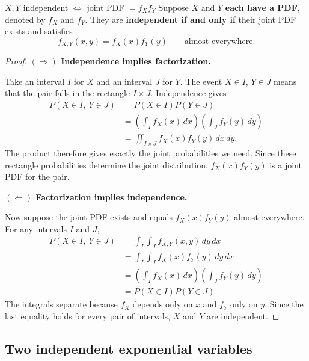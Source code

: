 \documentclass[a4paper,12pt,oneside]{report}
\begin{document}
\begin{framedprop}{$X,Y$ independent $\Longleftrightarrow$ joint PDF $=f_Xf_Y$}
\label{prop:independence-pdf}
Suppose $X$ and $Y$ \textbf{each have a PDF},
denoted by $f_X$ and $f_Y$. They are \textbf{independent if and only if}
their joint PDF exists and satisfies
\[
  f_{X,Y}(x,y)=f_X(x)f_Y(y)
  \qquad\text{almost everywhere}.
\]
\end{framedprop}
\begin{proof}
\textbf{$(\Rightarrow)$ Independence implies factorization.}\par
Take an interval $I$ for $X$ and an interval $J$ for $Y$.
The event $X\in I$, $Y\in J$ means that the pair falls in the
rectangle $I\times J$. Independence gives
\[
\begin{aligned}
  P(X\in I,\ Y\in J)
    &=P(X\in I)P(Y\in J)\\
    &=\left(\int_I f_X(x)\,dx\right)
      \left(\int_J f_Y(y)\,dy\right)\\
    &=\iint_{I\times J}f_X(x)f_Y(y)\,dx\,dy.
\end{aligned}
\]
The product therefore gives exactly the joint probabilities we
need. Since these rectangle probabilities determine the joint
distribution, $f_X(x)f_Y(y)$ is a joint PDF for the pair.

\textbf{$(\Leftarrow)$ Factorization implies independence.}\par
Now suppose the joint PDF exists and equals $f_X(x)f_Y(y)$ almost
everywhere. For any intervals $I$ and $J$,
\[
\begin{aligned}
  P(X\in I,\ Y\in J)
    &=\int_I\int_J f_{X,Y}(x,y)\,dy\,dx\\
    &=\int_I\int_J f_X(x)f_Y(y)\,dy\,dx\\
    &=\left(\int_I f_X(x)\,dx\right)
      \left(\int_J f_Y(y)\,dy\right)\\
    &=P(X\in I)P(Y\in J).
\end{aligned}
\]
The integrals separate because $f_X$ depends only on $x$ and
$f_Y$ only on $y$. Since the last equality holds for every pair
of intervals, $X$ and $Y$ are independent.
\end{proof}

\clearpage
\subsection{Two independent exponential variables}
\end{document}

